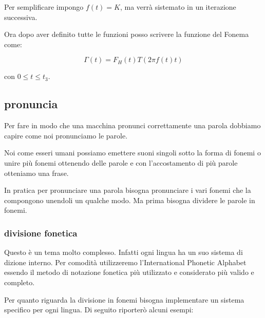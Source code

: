 \documentclass{article}
\begin{document}
Per semplificare impongo $f(t) = K$, ma verrà sistemato in un iterazione successiva.

Ora dopo aver definito tutte le funzioni posso scrivere la funzione del Fonema come:

$$\Gamma(t) = F_H(t) T(2\pi f(t) t)$$

con $0 \le t \le t_3$.

\subsection{pronuncia}
Per fare in modo che una macchina pronunci correttamente una parola dobbiamo capire come noi pronunciamo le parole.

Noi come esseri umani possiamo emettere suoni singoli sotto la forma di fonemi o unire più fonemi ottenendo delle parole e con l'accostamento di più parole otteniamo una frase.

In pratica per pronunciare una parola bisogna pronunciare i vari fonemi che la compongono unendoli un qualche modo. Ma prima bisogna dividere le parole in fonemi.

\subsubsection{divisione fonetica}
Questo è un tema molto complesso. Infatti ogni lingua ha un suo sistema di dizione interno. Per comodità utilizzeremo l’International Phonetic Alphabet essendo il metodo di notazione fonetica più utilizzato e considerato più valido e completo.

Per quanto riguarda la divisione in fonemi bisogna implementare un sistema specifico per ogni lingua. Di seguito riporterò alcuni esempi:
\end{document}
